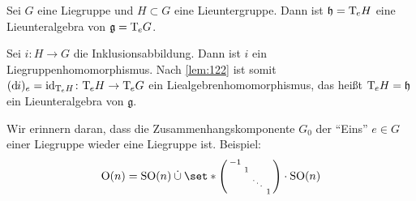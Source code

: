 \begin{lemma}
	Sei $G$ eine Liegruppe und $H \subset G$ eine Lieuntergruppe.
	Dann ist $\mathfrak{h} = \mathrm{T}\mkern-0.85mu_e H$ eine Lieunteralgebra von $\mathfrak{g} = \mathrm{T}\mkern-0.85mu_e G$.
\end{lemma}
\begin{beweis}
	Sei $i \colon H \to G$ die Inklusionsabbildung.
	Dann ist $i$ ein Liegruppenhomomorphismus.
	Nach \autoref{lem:122} ist somit $(\mathrm{d}\mkern-1.0mu i)_e = \operatorname{id}_{\mathrm{T}\mkern-0.85mu_e H} \colon \mathrm{T}\mkern-0.85mu_e H \to \mathrm{T}\mkern-0.85mu_e G$ ein Liealgebrenhomomorphismus, das heißt $\mathrm{T}\mkern-0.85mu_e H = \mathfrak{h}$ ein Lieunteralgebra von $\mathfrak{g}$.
\end{beweis}

Wir erinnern daran, dass die Zusammenhangskomponente $G_0$ der \enquote{Eins} $e \in G$ einer Liegruppe wieder eine Liegruppe ist.
Beispiel: 
\[
	\On(n)= \SO(n) \mathbin{\dot{\cup}} \set*{ \begin{psmallmatrix}
		-1 & & &\\
		& 1 &  &\\
		& & \ddots & \\
		& & & 1
	\end{psmallmatrix} \cdot \SO(n)}
\]

